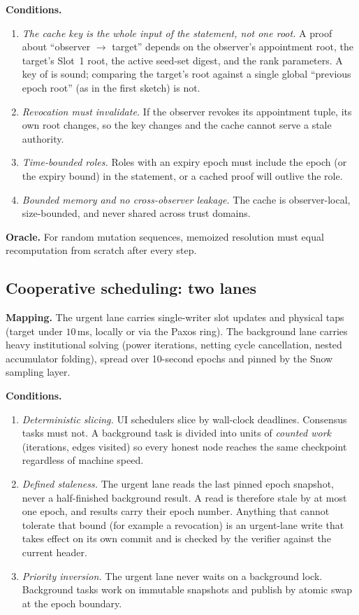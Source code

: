 \documentclass[a4paper,11pt,twoside,parskip=half-,headings=small]{scrartcl}
\begin{document}
\textbf{Conditions.}
\begin{enumerate}[nosep]
  \item \emph{The cache key is the whole input of the statement, not one root.} A proof about ``observer $\to$ target'' depends on the observer's appointment root, the target's Slot~1 root, the active seed-set digest, and the rank parameters.
        A key of  is sound; comparing the target's root against a single global ``previous epoch root'' (as in the first sketch) is not.
  \item \emph{Revocation must invalidate.} If the observer revokes its appointment tuple, its own root changes, so the key changes and the cache cannot serve a stale authority.
  \item \emph{Time-bounded roles.} Roles with an expiry epoch must include the epoch (or the expiry bound) in the statement, or a cached proof will outlive the role.
  \item \emph{Bounded memory and no cross-observer leakage.} The cache is observer-local, size-bounded, and never shared across trust domains.
\end{enumerate}

\textbf{Oracle.} For random mutation sequences, memoized resolution must equal recomputation from scratch after every step.

\subsection{Cooperative scheduling: two lanes}

\textbf{Mapping.} The urgent lane carries single-writer slot updates and physical taps (target under $10$\,ms, locally or via the Paxos ring). The background lane carries heavy institutional solving (power iterations, netting cycle cancellation, nested accumulator folding), spread over 10-second epochs and pinned by the Snow sampling layer.

\textbf{Conditions.}
\begin{enumerate}[nosep]
  \item \emph{Deterministic slicing.} UI schedulers slice by wall-clock deadlines. Consensus tasks must not. A background task is divided into units of \emph{counted work} (iterations, edges visited) so every honest node reaches the same checkpoint regardless of machine speed.
  \item \emph{Defined staleness.} The urgent lane reads the last pinned epoch snapshot, never a half-finished background result. A read is therefore stale by at most one epoch, and results carry their epoch number. Anything that cannot tolerate that bound (for example a revocation) is an urgent-lane write that takes effect on its own commit and is checked by the verifier against the current header.
  \item \emph{Priority inversion.} The urgent lane never waits on a background lock. Background tasks work on immutable snapshots and publish by atomic swap at the epoch boundary.
\end{enumerate}
\end{document}
